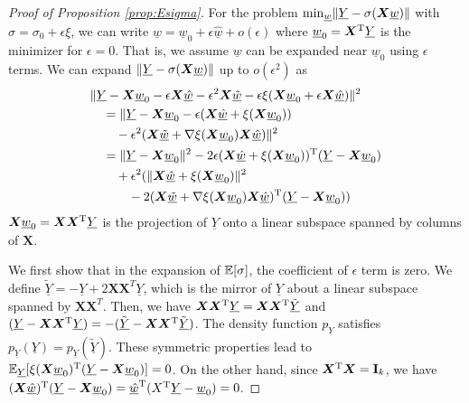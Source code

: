 \documentclass[appliedmath,article,accept,pdftex,moreauthors]{Definitions/mdpi}
\begin{document}
\begin{proof}[Proof of Proposition \ref{prop:Esigma}]
For the problem $\min_{\underline{w}} \lVert\underline{Y} - \sigma(\bm{X} \underline{w})\rVert$
with $\sigma = \sigma_0 + \epsilon \xi$, we can write $\underline{w} = \underline{w}_0
+ \epsilon \underline{\hat{w}} + o(\epsilon)$ where $\underline{w}_0 = \bm{X}^{\mathrm{T}} \underline{Y}$ is the minimizer for
$\epsilon = 0$. That is, we assume $\underline{w}$ can be expanded near $\underline{w}_0$
using $\epsilon$ terms. We can expand $\lVert\underline{Y} - \sigma(\bm{X} \underline{w})\rVert$ 
up to $o(\epsilon^2)$ as
\begin{align*}
&\lVert\underline{Y} - \bm{X} \underline{w}_0 - \epsilon \bm{X} \underline{\hat{w}} -
\epsilon^2 \bm{X} \underline{\tilde{w}} - \epsilon \xi(\bm{X} \underline{w}_0 +
\epsilon \bm{X} \underline{\hat{w}}) \rVert^2 \\
&\quad=  \lVert \underline{Y} - \bm{X}  \underline{w}_0 -
\epsilon (\bm{X}\underline{\hat{w}} + \xi(\bm{X} \underline{w}_0 )) \\
&\qquad-  \epsilon^2(\bm{X}\underline{\tilde{w}} + \nabla \xi(\bm{X} \underline{w}_0 )\bm{X}\underline{\hat{w}})\rVert^2 \\
&\quad=  \lVert\underline{Y}-\bm{X} \underline{w}_0  \rVert^2 -
2 \epsilon (\bm{X} \underline{\hat{w}} +
\xi(\bm{X} \underline{w}_0))^{\mathrm{T}} (\underline{Y} - \bm{X} \underline{w}_0) \\
& \qquad+  \epsilon^2(\lVert\bm{X}\underline{\hat{w}} + \xi(\bm{X} \underline{w}_0)\rVert^2 \\
& \qquad\quad -
2 (\bm{X} \underline{\tilde{w}}+
\nabla \xi(\bm{X} \underline{w}_0)\bm{X}\underline{\hat{w}})^{\mathrm{T}}(\underline{Y}-\bm{X} \underline{w}_0))
\end{align*}
$\bm{X}\underline{w}_0 = \bm{X}\bm{X}^{\mathrm{T}} \underline{Y}$ is the projection of $\underline{Y}$ onto a linear subspace spanned by
columns of $\bm{X}$.

We first show that in the expansion of $\mathbb{E}[\sigma]$, the coefficient of $\epsilon$ term is zero.
We define $\tilde{\underline{Y}} = -\underline{Y} + 2\bm{X}\bm{X}^T\underline{Y}$, which is
the mirror of $\underline{Y}$ about a linear subspace spanned by $\bm{X}\bm{X}^T$.
Then, we have
$\bm{X}\bm{X}^{\mathrm{T}} \underline{Y} = \bm{X}\bm{X}^{\mathrm{T}} \tilde{\underline{Y}}$ and
$(\underline{Y}- \bm{X}\bm{X}^{\mathrm{T}}\underline{Y}) = -(\tilde{\underline{Y}} - \bm{X}\bm{X}^{\mathrm{T}} \tilde{\underline{Y}})$.
The density function $p_{\underline{Y}}$ satisfies $p_{\underline{Y}}(\underline{Y})=p_{\underline{Y}}(\tilde{\underline{Y}})$.
These symmetric properties lead to $\mathbb{E}_{\underline{Y}}[\xi(\bm{X}\underline{w}_0)^{\mathrm{T}} (\underline{Y}-\bm{X}\underline{w}_0)]=0$.
On the other hand, since $\bm{X}^{\mathrm{T}} \bm{X} = \mathbf{I}_k$,
we have
$(\bm{X}\underline{\hat{w}})^{\mathrm{T}} (\underline{Y}-\bm{X}\underline{w}_0) = \underline{\hat{w}}^{\mathrm{T}} (X^{\mathrm{T}} \underline{Y} - \underline{w}_0) = 0$.


\end{proof}
\end{document}
